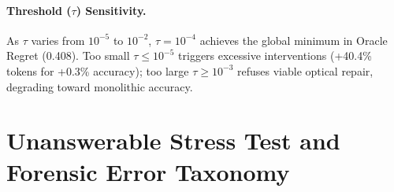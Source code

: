 \documentclass[11pt]{article}
\begin{document}
\begin{table}[h]
\centering
\small
{}
\vspace{-2mm}
\caption{\textbf{Systematic Component Ablation Study ($N = 2,000$ Stratified Subset).} Full \textsc{GVoC} scores 70.5\% / 272 tokens on this stratified ablation split, consistent with 70.2\% / 274 tokens across the full 16,000-query benchmark (Table~\ref{tab:headline_benchmark}). Removing cost normalization ($\mathcal{V} = \Delta P_a$) yields negligible accuracy gain (+0.6\%) while inflating token cost by +51.5\% and regret by 4.5$\times$.}
\label{tab:ablations}
\end{table}

\paragraph{Threshold ($\tau$) Sensitivity.}
As $\tau$ varies from $10^{-5}$ to $10^{-2}$, $\tau = 10^{-4}$ achieves the global minimum in Oracle Regret (0.408). Too small $\tau \le 10^{-5}$ triggers excessive interventions (+40.4\% tokens for +0.3\% accuracy); too large $\tau \ge 10^{-3}$ refuses viable optical repair, degrading toward monolithic accuracy.

\section{Unanswerable Stress Test and Forensic Error Taxonomy}
\label{app:stress_test}
\end{document}
